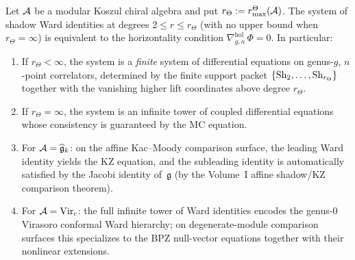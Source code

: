 \begin{theorem}
\label{thm:thqg-VI-ward-determines-correlators}
Let \(\mathcal{A}\) be a modular Koszul chiral algebra and put
\(r_\Theta:=r^\Theta_{\max}(\mathcal{A})\). The system of shadow Ward
identities at degrees \(2\le r\le r_\Theta\) (with no upper
bound when \(r_\Theta=\infty\)) is equivalent to the
horizontality condition $\nabla^{\mathrm{hol}}_{g,n}\,\Phi = 0$.
In particular:
\begin{enumerate}[label=\textup{(\roman*)}]
\item If \(r_\Theta<\infty\), the system is a \emph{finite}
 system of differential equations on genus-$g$, $n$-point
 correlators, determined by the finite support packet
 \(\{\operatorname{Sh}_2,\dotsc,\operatorname{Sh}_{r_\Theta}\}\) together with the vanishing
 higher lift coordinates above degree \(r_\Theta\).
\item If \(r_\Theta=\infty\), the system is an infinite tower
 of coupled differential equations whose consistency is
 guaranteed by the MC equation.
\item For $\mathcal{A} = \widehat{\mathfrak{g}}_k$:
 on the affine Kac--Moody comparison surface, the leading Ward
 identity yields the KZ equation, and the
 subleading identity is automatically satisfied by the Jacobi
 identity of~$\mathfrak{g}$
 (by the Volume~I affine shadow/KZ comparison theorem).
\item For $\mathcal{A} = \mathrm{Vir}_c$: the full infinite tower of
 Ward identities encodes the genus-$0$ Virasoro conformal Ward
 hierarchy; on degenerate-module comparison surfaces this
 specializes to the BPZ null-vector equations together with
 their nonlinear extensions.
\end{enumerate}
\end{theorem}

